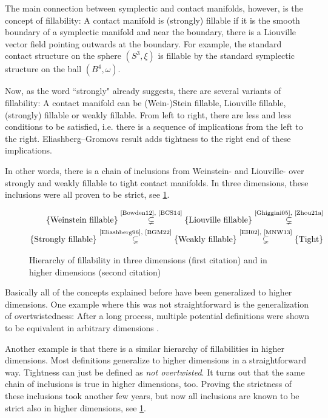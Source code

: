 The main connection between symplectic and contact manifolds, however, is the concept of fillability:
A contact manifold is (strongly) fillable if it is the smooth boundary of a symplectic manifold and
near the boundary, there is a Liouville vector field pointing outwards at the boundary.
For example, the standard contact structure on the sphere $(S^3, \xi)$ is fillable
by the standard symplectic structure on the ball $(B^4, \omega)$.

Now, as the word ``strongly" already suggests, there are several variants of fillability:
A contact manifold can be (Wein-)Stein fillable, Liouville fillable, (strongly) fillable or weakly fillable.
From left to right, there are less and less conditions to be satisfied, i.e. there is a sequence
of implications from the left to the right. 
Eliashberg--Gromovs result adds tightness to the right end of these implications.

In other words, there is a chain of inclusions from 
Weinstein- and Liouville- over strongly and weakly fillable to tight contact manifolds.
In three dimensions, these inclusions were all proven to be strict, see \cref{fig:fillability}.
\begin{figure}
    \begin{align*}
        \{\text{Weinstein fillable}\} \stackrel{\text{\cite{Bowden12}, \cite{BCS14}}}{\subsetneq} 
        \{\text{Liouville fillable}\} \stackrel{\text{\cite{Ghiggini05}, \cite{Zhou21a}}}{\subsetneq}\\
        \{\text{Strongly  fillable}\} \stackrel{\text{\cite{Eliashberg96}, \cite{BGM22}}}{\subsetneq}
        \{\text{Weakly    fillable}\} \stackrel{\text{\cite{EH02}, \cite{MNW13}}}{\subsetneq}
        \{\text{Tight}\}
    \end{align*}
    \caption{Hierarchy of fillability in three dimensions (first citation) and in higher dimensions (second citation)}
    \label{fig:fillability}
\end{figure}

Basically all of the concepts explained before have been generalized to higher dimensions.
One example where this was not straightforward is the generalization of overtwistedness: 
After a long process, multiple potential definitions were shown to be equivalent in arbitrary dimensions \cite{BEM15,CMP19,Huang17}.

Another example is that there is a similar hierarchy of fillabilities in higher dimensions. 
Most definitions generalize to higher dimensions in a straightforward way. Tightness can just be defined as \textit{not overtwisted}.
It turns out that the same chain of inclusions is true in higher dimensions, too.
Proving the strictness of these inclusions took another few years, but now all inclusions are known to be strict also in higher dimensions, 
see \cref{fig:fillability}.

